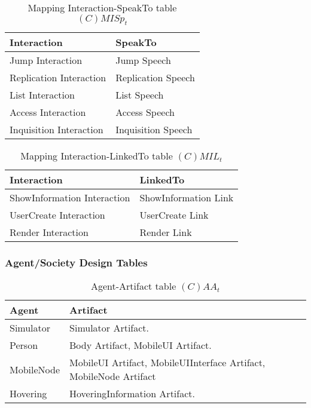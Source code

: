 \begin{table}[H]
	\centering
	\begin{tabular}{|p{4cm}|p{8cm}|}
			\hline
			\textbf{Interaction} & \textbf{SpeakTo} \\
			\hline
			Jump Interaction & Jump Speech \\
			\hline
			Replication Interaction & Replication Speech \\
			\hline
			List Interaction & List Speech \\
			\hline
			Access Interaction & Access Speech \\
			\hline
			Inquisition Interaction & Inquisition Speech \\
			\hline
		\end{tabular}
	\caption{Mapping Interaction-SpeakTo table $(C)MISp_t$}
	\label{tab:cmispt}
\end{table}

\begin{table}[H]
	\centering
	\begin{tabular}{|p{4cm}|p{8cm}|}
			\hline
			\textbf{Interaction} & \textbf{LinkedTo} \\
			\hline
			ShowInformation Interaction & ShowInformation Link \\
			\hline
			UserCreate Interaction & UserCreate Link \\
			\hline
			Render Interaction & Render Link\\
			\hline
		\end{tabular}
	\caption{Mapping Interaction-LinkedTo table $(C)MIL_t$}
	\label{tab:cmilt}
\end{table}

\subsubsection{Agent/Society Design Tables}

\begin{table}[H]
	\centering
	\begin{tabular}{|p{4cm}|p{8cm}|}
			\hline
			\textbf{Agent} & \textbf{Artifact} \\
			\hline
			Simulator & Simulator Artifact. \\
			\hline
			Person & Body Artifact, MobileUI Artifact. \\
			\hline
      MobileNode & MobileUI Artifact, MobileUIInterface Artifact, MobileNode
      Artifact\\
			\hline
			Hovering & HoveringInformation Artifact. \\
			\hline
		\end{tabular}
	\caption{Agent-Artifact table $(C)AA_t$}
	\label{tab:caat}
\end{table}

